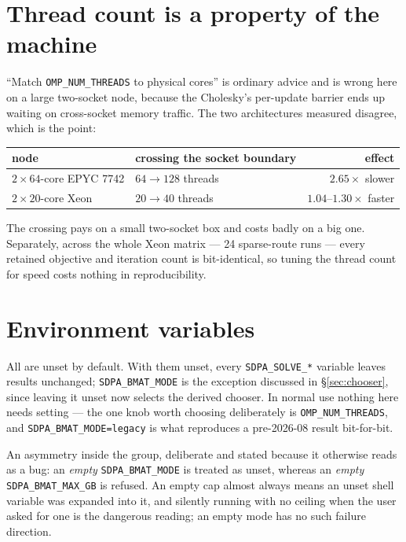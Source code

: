 \documentclass[11pt]{article}
\newcommand{\code}[1]{\texttt{#1}}
\begin{document}
\section{Thread count is a property of the machine}

``Match \code{OMP\_NUM\_THREADS} to physical cores'' is ordinary advice and is wrong here on a
large two-socket node, because the Cholesky's per-update barrier ends up waiting on cross-socket
memory traffic. The two architectures measured disagree, which is the point:

\begin{center}
\begin{tabular}{llr}
\toprule
node & crossing the socket boundary & effect \\
\midrule
$2\times64$-core EPYC 7742 & $64 \to 128$ threads & $2.65\times$ slower \\
$2\times20$-core Xeon & $20 \to 40$ threads & $1.04$--$1.30\times$ faster \\
\bottomrule
\end{tabular}
\end{center}

The crossing pays on a small two-socket box and costs badly on a big one. Separately, across the
whole Xeon matrix --- 24 sparse-route runs --- every retained objective and iteration count is
bit-identical, so tuning the thread count for speed costs nothing in reproducibility.

\section{Environment variables}
\label{sec:envvars}

All are unset by default. With them unset, every \code{SDPA\_SOLVE\_*} variable leaves results
unchanged; \code{SDPA\_BMAT\_MODE} is the exception discussed in \S\ref{sec:chooser}, since leaving
it unset now selects the derived chooser. In normal use nothing here needs setting --- the one knob
worth choosing deliberately is \code{OMP\_NUM\_THREADS}, and \code{SDPA\_BMAT\_MODE=legacy} is what
reproduces a pre-2026-08 result bit-for-bit.

An asymmetry inside the group, deliberate and stated because it otherwise reads as a bug: an
\emph{empty} \code{SDPA\_BMAT\_MODE} is treated as unset, whereas an \emph{empty}
\code{SDPA\_BMAT\_MAX\_GB} is refused. An empty cap almost always means an unset shell variable was
expanded into it, and silently running with no ceiling when the user asked for one is the dangerous
reading; an empty mode has no such failure direction.
\end{document}
